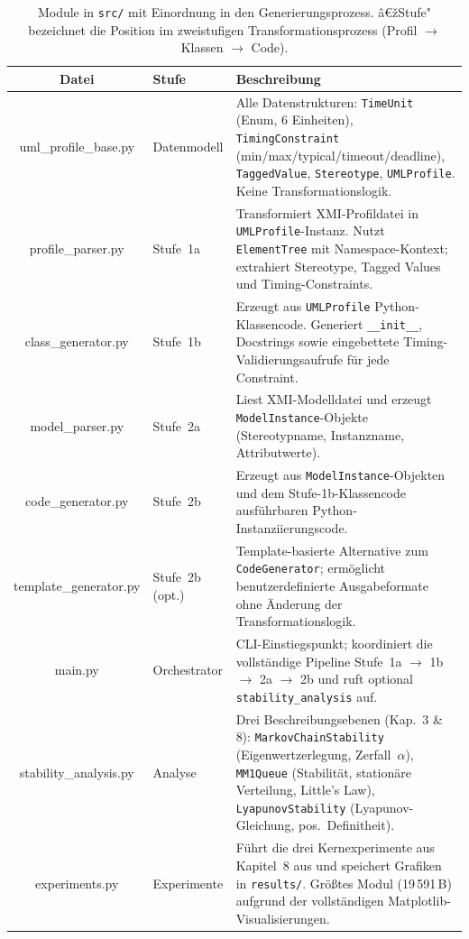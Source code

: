 ﻿\documentclass[a4paper,12pt]{report}
\theoremstyle{definition}
\begin{document}
\begin{table}[H]
	\small
	\centering
	\renewcommand{\arraystretch}{1.35}
	\begin{tabular}{@{} C l p{6.1cm} @{}}
		\toprule
		\normalfont\textbf{Datei} &
		\textbf{Stufe} &
		\textbf{Beschreibung} \\
		\midrule
		uml\_profile\_base.py  & Datenmodell &
		Alle Datenstrukturen: \texttt{TimeUnit} (Enum, 6 Einheiten),
		\texttt{TimingConstraint} (min/max/typical/timeout/deadline),
		\texttt{TaggedValue}, \texttt{Stereotype}, \texttt{UMLProfile}.
		Keine Transformationslogik. \\
		
		profile\_parser.py     & Stufe~1a &
		Transformiert XMI-Profildatei in \texttt{UMLProfile}-Instanz.
		Nutzt \texttt{ElementTree} mit Namespace-Kontext; extrahiert
		Stereotype, Tagged Values und Timing-Constraints. \\
		
		class\_generator.py    & Stufe~1b &
		Erzeugt aus \texttt{UMLProfile} Python-Klassencode.
		Generiert \texttt{\_\_init\_\_}, Docstrings sowie eingebettete
		Timing-Validierungsaufrufe für jede Constraint. \\
		
		model\_parser.py       & Stufe~2a &
		Liest XMI-Modelldatei und erzeugt \texttt{ModelInstance}-Objekte
		(Stereotypname, Instanzname, Attributwerte). \\
		
		code\_generator.py     & Stufe~2b &
		Erzeugt aus \texttt{ModelInstance}-Objekten und dem
		Stufe-1b-Klassencode ausführbaren Python-Instanziierungscode. \\
		
		template\_generator.py & Stufe~2b (opt.) &
		Template-basierte Alternative zum \texttt{CodeGenerator};
		ermöglicht benutzerdefinierte Ausgabeformate ohne Änderung
		der Transformationslogik. \\
		
		main.py                & Orchestrator &
		CLI-Einstiegspunkt; koordiniert die vollständige Pipeline
		Stufe~1a $\to$ 1b $\to$ 2a $\to$ 2b und ruft optional
		\texttt{stability\_analysis} auf. \\
		
		stability\_analysis.py & Analyse &
		Drei Beschreibungsebenen (Kap.~3 \& 8):
		\texttt{MarkovChainStability} (Eigenwertzerlegung, Zerfall~$\alpha$),
		\texttt{MM1Queue} (Stabilität, stationäre Verteilung, Little's Law),
		\texttt{LyapunovStability} (Lyapunov-Gleichung, pos.\ Definitheit). \\
		
		experiments.py         & Experimente &
		Führt die drei Kernexperimente aus Kapitel~8 aus und speichert
		Grafiken in \texttt{results/}. Größtes Modul (19\,591\,B)
		aufgrund der vollständigen Matplotlib-Visualisierungen. \\
		\bottomrule
	\end{tabular}
	\caption{Module in \texttt{src/} mit Einordnung in den
		Generierungsprozess.  â€žStufe" bezeichnet die Position
		im zweistufigen Transformationsprozess
		(Profil $\to$ Klassen $\to$ Code).}
	\label{tab:module-src}
\end{table}
\end{document}
